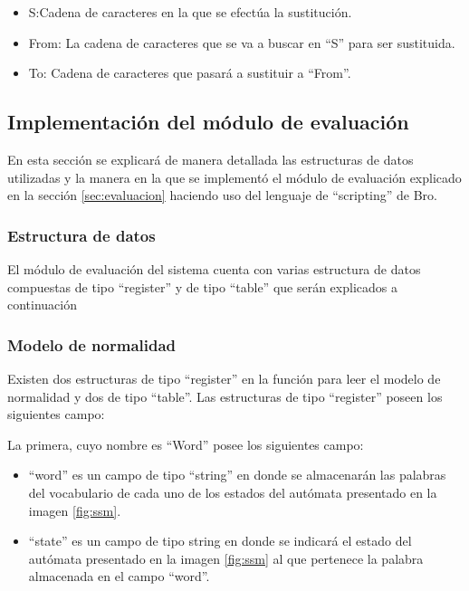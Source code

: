 \begin{itemize}
\item S:Cadena de caracteres en la que se efectúa la sustitución.
\item From: La cadena de caracteres que se va a buscar en ``S'' para ser
sustituida.
\item To: Cadena de caracteres que pasará a sustituir a ``From''.
\end{itemize}

\subsection{Implementación del módulo de evaluación}

En esta sección se explicará de manera detallada las estructuras de datos utilizadas y la manera en la que se implementó el módulo de evaluación explicado en la sección \ref{sec:evaluacion}  haciendo uso del lenguaje de ``scripting'' de Bro.

\subsubsection{Estructura de datos}

El módulo de evaluación del sistema cuenta con varias estructura de datos compuestas de tipo ``register'' y de tipo ``table'' que serán explicados a continuación 

\subsubsection*{Modelo de normalidad}
\label{sssec:estructuraModelo}

Existen dos estructuras de tipo ``register'' en la función para leer el modelo de normalidad y dos de tipo ``table''.
Las estructuras de tipo ``register'' poseen los siguientes campo:

La primera, cuyo nombre es ``Word'' posee los siguientes campo:
\begin{itemize}
\item ``word'' es un campo de tipo ``string'' en donde se almacenarán las palabras del vocabulario de cada uno de los estados del autómata presentado en la imagen \ref{fig:ssm}.
\item ``state'' es un campo de tipo string en donde se indicará el estado del autómata presentado en la imagen \ref{fig:ssm} al que pertenece la palabra almacenada en el campo ``word''.
\end{itemize}

